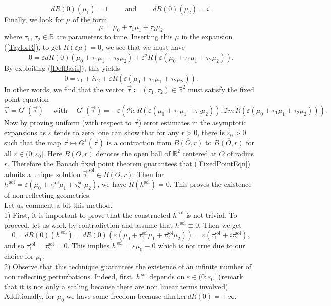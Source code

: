 \documentclass[11pt,a4paper]{report}
\newcommand{\eps}{\varepsilon}
\newcommand{\mrm}[1]{\mathrm{#1}}
\newcommand{\R}{\mathbb{R}}
\renewcommand{\ker}{\mrm{ker}}
\renewcommand{\dim}{\mrm{dim}}
\begin{document}
\begin{equation}\label{DefBasis}
dR(0)(\mu_1)=1\qquad\mbox{ and }\qquad dR(0)(\mu_2)=i.
\end{equation}
Finally, we look for $\mu$ of the form
\[
\mu=\mu_0+\tau_1\mu_1+\tau_2\mu_2
\]
where $\tau_1$, $\tau_2\in\R$ are parameters to tune. Inserting this $\mu$ in the expansion (\ref{TaylorR}), to get $R(\eps \mu)=0$, we see that we must have
\[
0= \eps dR(0)(\mu_0+\tau_1\mu_1+\tau_2\mu_2)+\eps^2 \tilde{R}(\eps(\mu_0+\tau_1\mu_1+\tau_2\mu_2)).
\]
By exploiting (\ref{DefBasis}), this yields 
\[
0=\tau_1+i\tau_2+\eps \tilde{R}(\eps(\mu_0+\tau_1\mu_1+\tau_2\mu_2)).
\]
In other words, we find that the vector $\vec{\tau}\coloneqq(\tau_1,\tau_2)\in\R^2$ must satisfy the fixed point equation
\begin{equation}\label{FixedPointEqn}
\vec{\tau}=G^\eps(\vec{\tau})\quad\mbox{ with }\quad G^\eps(\vec{\tau})=-\eps(\Re e\,\tilde{R}(\eps(\mu_0+\tau_1\mu_1+\tau_2\mu_2)),\Im m\,\tilde{R}(\eps(\mu_0+\tau_1\mu_1+\tau_2\mu_2))).
\end{equation}
Now by proving uniform (with respect to $\vec{\tau}$) error estimates in the asymptotic expansions as $\eps$ tends to zero, one can show that for any $r>0$, there is $\eps_0>0$ such that the map $\vec{\tau}\mapsto G^\eps(\vec{\tau})$ is a contraction from $\overline{B(O,r)}$ to $\overline{B(O,r)}$ for all $\eps\in(0;\eps_0]$. Here $B(O,r)$ denotes the open ball of $\R^2$ centered at $O$ of radius $r$. Therefore the Banach fixed point theorem guarantees that (\ref{FixedPointEqn}) admits a unique solution $\vec{\tau}^{\,\mrm{sol}}\in\overline{B(O,r)}$. Then for $h^{\,\mrm{sol}}=\eps(\mu_0+\tau_1^{\mrm{sol}}\mu_1+\tau_2^{\mrm{sol}}\mu_2)$, we have $R(h^{\mrm{sol}})=0$. This proves the existence of non reflecting geometries.\\
\newline
Let us comment a bit this method.\\[4pt]
1) First, it is important to prove that the constructed $h^{\,\mrm{sol}}$ is not trivial. To proceed, let us work by contradiction and assume that $h^{\,\mrm{sol}}\equiv0$. Then we get
\[
0=dR(0)(h^{\,\mrm{sol}})=dR(0)(\eps(\mu_0+\tau_1^{\mrm{sol}}\mu_1+\tau_2^{\mrm{sol}}\mu_2))=\eps(\tau_1^{\mrm{sol}}+i\tau_2^{\mrm{sol}}),
\]
and so $\tau_1^{\mrm{sol}}=\tau_2^{\mrm{sol}}=0$. This implies $h^{\,\mrm{sol}}=\eps\mu_0\equiv0$ which is not true due to our choice for $\mu_0$.\\[4pt]
2) Observe that this technique guarantees the existence of an infinite number of non reflecting perturbations. Indeed, first, $h^{\,\mrm{sol}}$ depends on $\eps\in(0;\eps_0]$ (remark that it is not only a scaling because there are non linear terms involved). Additionally, for $\mu_0$   we have some freedom because $\dim\,\ker\,dR(0)=+\infty$.\\[4pt] 
\end{document}
